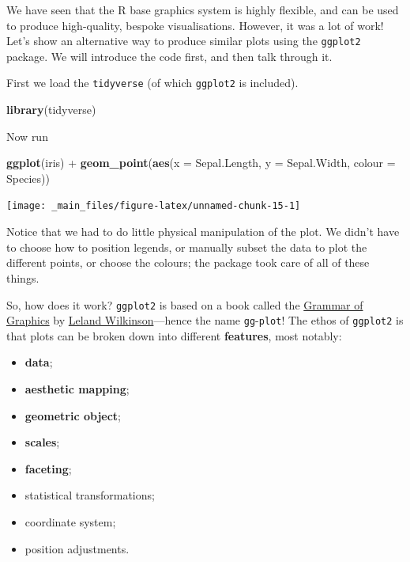 \documentclass[]{book}
\newenvironment{Shaded}{\begin{snugshade}}{\end{snugshade}}
\newcommand{\KeywordTok}[1]{\textcolor[rgb]{0.13,0.29,0.53}{\textbf{{#1}}}}
\newcommand{\DataTypeTok}[1]{\textcolor[rgb]{0.13,0.29,0.53}{{#1}}}
\newcommand{\StringTok}[1]{\textcolor[rgb]{0.31,0.60,0.02}{{#1}}}
\newcommand{\NormalTok}[1]{{#1}}
\providecommand{\tightlist}{%
  \setlength{\itemsep}{0pt}\setlength{\parskip}{0pt}}
\theoremstyle{definition}
\theoremstyle{definition}
\theoremstyle{definition}
\theoremstyle{remark}
\begin{document}
We have seen that the R base graphics system is highly flexible, and can
be used to produce high-quality, bespoke visualisations. However, it was
a lot of work! Let's show an alternative way to produce similar plots
using the \texttt{ggplot2} package. We will introduce the code first,
and then talk through it.

First we load the \texttt{tidyverse} (of which \texttt{ggplot2} is
included).

\begin{Shaded}
\begin{Highlighting}[]
\KeywordTok{library}\NormalTok{(tidyverse)}
\end{Highlighting}
\end{Shaded}

Now run

\begin{Shaded}
\begin{Highlighting}[]
\KeywordTok{ggplot}\NormalTok{(iris) +}
\StringTok{    }\KeywordTok{geom_point}\NormalTok{(}\KeywordTok{aes}\NormalTok{(}\DataTypeTok{x =} \NormalTok{Sepal.Length, }\DataTypeTok{y =} \NormalTok{Sepal.Width, }\DataTypeTok{colour =} \NormalTok{Species))}
\end{Highlighting}
\end{Shaded}

\begin{center}\texttt{[image: \_main\_files/figure-latex/unnamed-chunk-15-1]} \end{center}

Notice that we had to do little physical manipulation of the plot. We
didn't have to choose how to position legends, or manually subset the
data to plot the different points, or choose the colours; the package
took care of all of these things.

So, how does it work? \texttt{ggplot2} is based on a book called the
\href{https://www.amazon.co.uk/Grammar-Graphics-Statistics-Computing/dp/0387245448}{Grammar
of Graphics} by
\href{https://en.wikipedia.org/wiki/Leland_Wilkinson}{Leland
Wilkinson}---hence the name \texttt{gg}-\texttt{plot}! The ethos of
\texttt{ggplot2} is that plots can be broken down into different
\textbf{features}, most notably:

\begin{itemize}
\tightlist
\item
  \textbf{data};
\item
  \textbf{aesthetic mapping};
\item
  \textbf{geometric object};
\item
  \textbf{scales};
\item
  \textbf{faceting};
\item
  statistical transformations;
\item
  coordinate system;
\item
  position adjustments.
\end{itemize}
\end{document}
